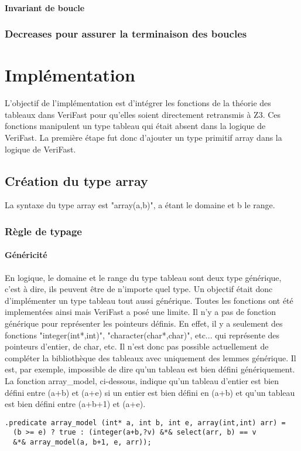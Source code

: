\documentclass[9pt]{book}
\newcommand{\verifast}{VeriFast}
\begin{document}
		\subsubsection{Invariant de boucle}

		\subsection{Decreases pour assurer la terminaison des boucles}

\chapter{Impl\'ementation}
	L'objectif de l'impl\'ementation est d'int\'egrer les fonctions de la th\'eorie des tableaux dans \verifast{} pour qu'elles soient directement retransmis \`a Z3. Ces fonctions manipulent un type tableau qui \'etait absent dans la logique de \verifast{}. La premi\`ere \'etape fut donc d'ajouter un type primitif array dans la logique de \verifast{}.
	\section{Cr\'eation du type array}
		La syntaxe du type array est "array(a,b)", a \'etant le domaine et b le range.
		\subsection{R\`egle de typage}
			\subsubsection{G\'en\'ericit\'e}
			En logique, le domaine et le range du type tableau sont deux type g\'en\'erique, c'est \`a dire, ils peuvent \^etre de n'importe quel type. Un objectif \'etait donc d'impl\'ementer un type tableau tout aussi g\'en\'erique. Toutes les fonctions ont \'et\'e implement\'ees ainsi mais \verifast{} a pos\'e une limite. Il n'y a pas de fonction g\'en\'erique pour repr\'esenter les pointeurs d\'efinis. En effet, il y a seulement des fonctions "integer(int*,int)", "character(char*,char)", etc... qui repr\'esente des pointeurs d'entier, de char, etc. Il n'est donc pas possible actuellement de compl\'eter la biblioth\`eque des tableaux avec uniquement des lemmes g\'en\'erique. Il est, par exemple, impossible de dire qu'un tableau est bien d\'efini g\'en\'eriquement. La fonction array\_model, ci-dessous, indique qu'un tableau d'entier est bien d\'efini entre (a+b) et (a+e) si un entier est bien d\'efini en (a+b) et qu'un tableau est bien d\'efini entre (a+b+1) et (a+e).
\begin{lstlisting}
.predicate array_model (int* a, int b, int e, array(int,int) arr) =
  (b >= e) ? true : (integer(a+b,?v) &*& select(arr, b) == v
  &*& array_model(a, b+1, e, arr));
\end{lstlisting}
\end{document}
